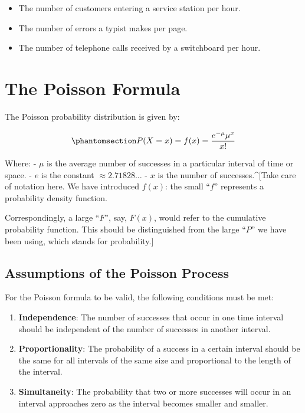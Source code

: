 \documentclass[
  letterpaper,
  DIV=11,
  numbers=noendperiod]{scrreprt}
\providecommand{\tightlist}{%
  \setlength{\itemsep}{0pt}\setlength{\parskip}{0pt}}
\begin{document}
\begin{itemize}
\tightlist
\item
  The number of customers entering a service station per hour.
\item
  The number of errors a typist makes per page.
\item
  The number of telephone calls received by a switchboard per hour.
\end{itemize}

\section{The Poisson Formula}\label{the-poisson-formula}

The Poisson probability distribution is given by:

\begin{equation}\phantomsection\label{eq-poisson}{
P(X=x) = f(x) = \frac{e^{-\mu} \mu^x}{x!}
}\end{equation}

Where: - \(\mu\) is the average number of successes in a particular
interval of time or space. - \(e\) is the constant
\(\approx 2.71828\dots\) - \(x\) is the number of successes.\^{}{[}Take
care of notation here. We have introduced \(f(x)\): the small ``\(f\)''
represents a probability density function.

Correspondingly, a large ``\(F\)'', say, \(F(x)\), would refer to the
cumulative probability function. This should be distinguished from the
large ``\(P\)'' we have been using, which stands for probability.{]}

\subsection{Assumptions of the Poisson
Process}\label{assumptions-of-the-poisson-process}

For the Poisson formula to be valid, the following conditions must be
met:

\begin{enumerate}
\def\labelenumi{\arabic{enumi}.}
\tightlist
\item
  \textbf{Independence}: The number of successes that occur in one time
  interval should be independent of the number of successes in another
  interval.
\item
  \textbf{Proportionality}: The probability of a success in a certain
  interval should be the same for all intervals of the same size and
  proportional to the length of the interval.
\item
  \textbf{Simultaneity}: The probability that two or more successes will
  occur in an interval approaches zero as the interval becomes smaller
  and smaller.
\end{enumerate}
\end{document}

